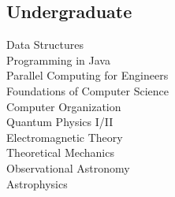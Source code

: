 \documentclass[letterpaper]{deedy-resume} %
\begin{document}
\begin{minipage}[t]{0.33\textwidth}
\subsection{Undergraduate}
Data Structures\\
Programming in Java\\
Parallel Computing for Engineers\\
Foundations of Computer Science\\
Computer Organization\\
Quantum Physics I/II\\
Electromagnetic Theory\\
Theoretical Mechanics\\
Observational Astronomy\\
Astrophysics



\end{minipage} %
\hfill
%
%
\end{document}
